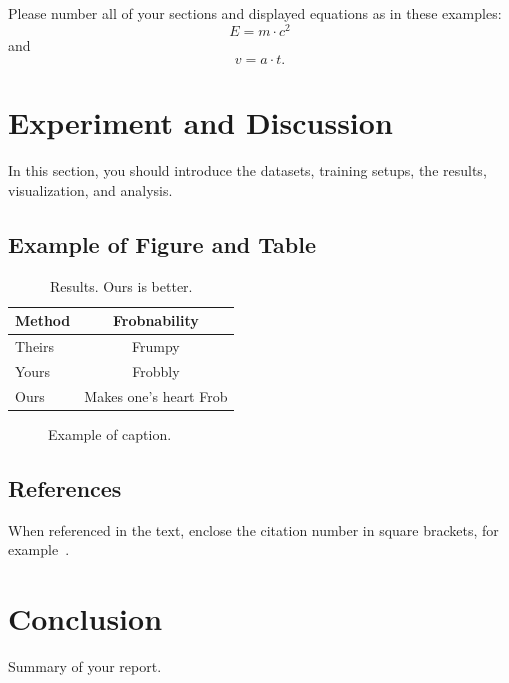 \documentclass[10pt,twocolumn,letterpaper]{article}
\begin{document}
Please number all of your sections and displayed equations as in these examples:
\begin{equation}
  E = m\cdot c^2
  \label{eq:important}
\end{equation}
and
\begin{equation}
  v = a\cdot t.
  \label{eq:also-important}
\end{equation}

\section{Experiment and Discussion}
\label{sec:Exp}

In this section, you should introduce the datasets, training setups, the results, visualization, and analysis.

\subsection{Example of Figure and Table}

\begin{table}[ht]
	\centering
	\begin{tabular}{@{}lc@{}}
		\toprule
		Method & Frobnability \\
		\midrule
		Theirs & Frumpy \\
		Yours & Frobbly \\
		Ours & Makes one's heart Frob\\
		\bottomrule
	\end{tabular}
	\caption{Results.   Ours is better.}
	\label{tab:example}
\end{table}


\begin{figure}[ht]
	\centering
	\fbox{\rule{0pt}{2in} \rule{0.9\linewidth}{0pt}}
	\caption{Example of caption.}
	\label{fig:example}
\end{figure}


\subsection{References}

When referenced in the text, enclose the citation number in square brackets, for
example~\cite{Authors14}.



\section{Conclusion}
Summary of your report.



{\small


}
\end{document}
